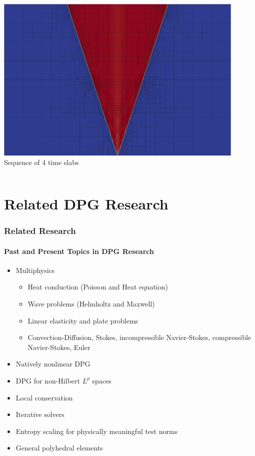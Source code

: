 \documentclass[18pt,xcolor=table]{beamer}
\begin{document}
\begin{frame}[t]
\begin{columns}[t]
\begin{column}[T]{0.55\textwidth} %
\centering
\vspace{2ex}
\includegraphics[width=0.9\textwidth]{Noh/MinNSDecoupled/mesh9.png}\\
\centering
Sequence of 4 time slabs
\end{column}
\end{columns}

\end{frame}


\section{Related DPG Research}
\begin{frame}[t]
\frametitle{Related Research}
\framesubtitle{Past and Present Topics in DPG Research}  %
\begin{itemize}
\item Multiphysics
\begin{itemize}
  \item Heat conduction (Poisson and Heat equation)
  \item Wave problems (Helmholtz and Maxwell)
  \item Linear elasticity and plate problems
  \item Convection-Diffusion, Stokes, incompressible Navier-Stokes, compressible Navier-Stokes, Euler
\end{itemize}
\item Natively nonlinear DPG
\item DPG for non-Hilbert $L^p$ spaces
\item Local conservation
\item Iterative solvers
\item Entropy scaling for physically meaningful test norms
\item General polyhedral elements
\end{itemize}
\end{frame}
\end{document}
